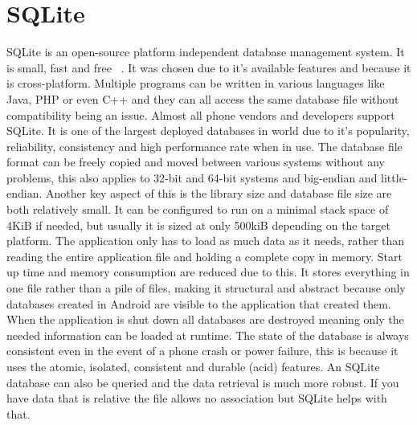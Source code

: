 \section{SQLite}
SQLite is an open-source platform independent database management system. It is small, fast and free ~\cite{sqlite}. It was chosen due to it's available features and because it is cross-platform. Multiple programs can be written in various languages like Java, PHP or even C++ and they can all access the same database file without compatibility being an issue. Almost all phone vendors and developers support SQLite. It is one of the largest deployed databases in world due to it's popularity, reliability, consistency and high performance rate when in use. The database file format can be freely copied and moved between various systems without any problems, this also applies to 32-bit and 64-bit systems and big-endian and little-endian. Another key aspect of this is the library size and database file size are both relatively small. It can be configured to run on a minimal stack space of 4KiB if needed, but usually it is sized at only 500kiB depending on the target platform. The application only has to load as much data as it needs, rather than reading the entire application file and holding a complete copy in memory. Start up time and memory consumption are reduced due to this. It stores everything in one file rather than a pile of files, making it structural and abstract because only databases created in Android are visible to the application that created them. When the application is shut down all databases are destroyed meaning only the needed information can be loaded at runtime. The state of the database is always consistent even in the event of a phone crash or power failure, this is because it uses the atomic, isolated, consistent and durable (acid) features. An SQLite database can also be queried and the data retrieval is much more robust. If you have data that is relative the file allows no association but SQLite helps with that.

